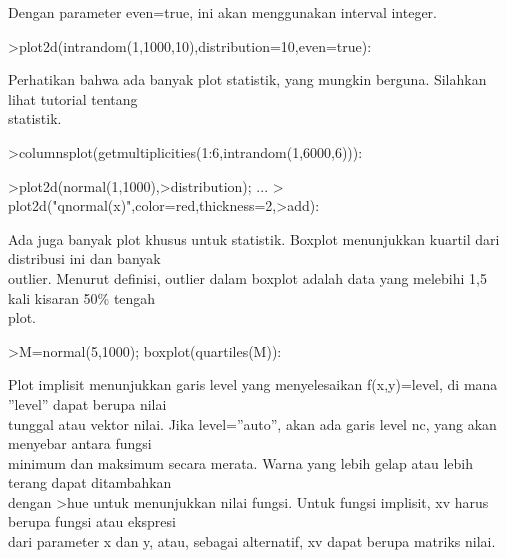 \documentclass[a4paper,10pt]{article}
\begin{document}
\begin{eulernotebook}
\begin{eulercomment}
\begin{eulercomment}
\begin{eulercomment}
\begin{eulercomment}
\begin{eulercomment}
\begin{eulercomment}
\begin{eulercomment}
Dengan parameter even=true, ini akan menggunakan interval integer.
\end{eulercomment}
\begin{eulerprompt}
>plot2d(intrandom(1,1000,10),distribution=10,even=true):
\end{eulerprompt}
\begin{eulercomment}
Perhatikan bahwa ada banyak plot statistik, yang mungkin berguna.
Silahkan lihat tutorial tentang\\
statistik.
\end{eulercomment}
\begin{eulerprompt}
>columnsplot(getmultiplicities(1:6,intrandom(1,6000,6))):
\end{eulerprompt}
\begin{eulerprompt}
>plot2d(normal(1,1000),>distribution); ...
>  plot2d("qnormal(x)",color=red,thickness=2,>add):
\end{eulerprompt}
\begin{eulercomment}
Ada juga banyak plot khusus untuk statistik. Boxplot menunjukkan
kuartil dari distribusi ini dan banyak\\
outlier. Menurut definisi, outlier dalam boxplot adalah data yang
melebihi 1,5 kali kisaran 50\% tengah\\
plot.
\end{eulercomment}
\begin{eulerprompt}
>M=normal(5,1000); boxplot(quartiles(M)):
\end{eulerprompt}
\begin{eulercomment}
Plot implisit menunjukkan garis level yang menyelesaikan f(x,y)=level,
di mana ”level” dapat berupa nilai\\
tunggal atau vektor nilai. Jika level=”auto”, akan ada garis level nc,
yang akan menyebar antara fungsi\\
minimum dan maksimum secara merata. Warna yang lebih gelap atau lebih
terang dapat ditambahkan\\
dengan \textgreater{}hue untuk menunjukkan nilai fungsi. Untuk fungsi implisit, xv
harus berupa fungsi atau ekspresi\\
dari parameter x dan y, atau, sebagai alternatif, xv dapat berupa
matriks nilai.


\end{eulercomment}
\end{eulercomment}
\end{eulercomment}
\end{eulercomment}
\end{eulercomment}
\end{eulercomment}
\end{eulercomment}
\end{eulernotebook}
\end{document}
